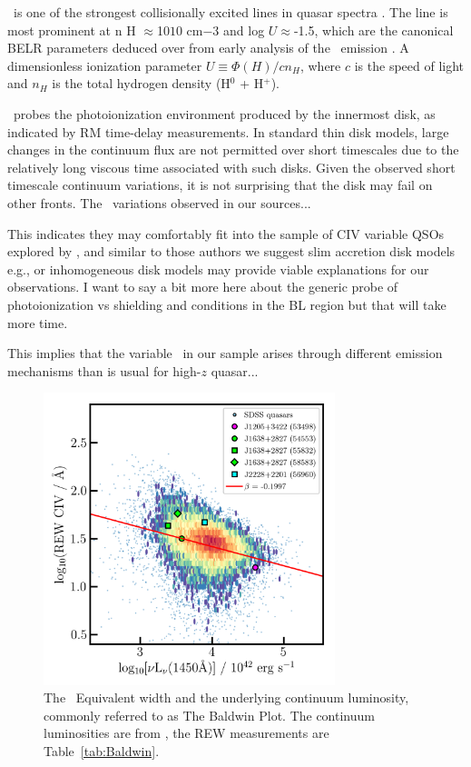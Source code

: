 \documentclass[a4paper,fleqn,usenatbib]{mnras}
\begin{document}
\civ\ is one of the strongest collisionally excited lines in quasar
spectra \citet[e.g.][]{HamannFerland1999}.  The line is most prominent
at n H $\approx$10$10$ cm$-3$ and log $U$$\approx$-1.5, which are the
canonical BELR parameters deduced over from early analysis of the
\civ\ emission \citep{Davidson_Netzer1979}.  A dimensionless
ionization parameter $U\equiv \Phi(H) / c n_{H}$, where $c$ is the
speed of light and $n_{H}$ is the total hydrogen density (H$^{0}$ +
H$^{+}$).

\civ\ probes the photoionization environment produced by the innermost
disk, as indicated by RM time-delay measurements. In standard \citet{SS73}
thin disk models, large changes in the continuum flux are not
permitted over short timescales due to the relatively long viscous
time associated with such disks. Given the observed short timescale
continuum variations, it is not surprising that the \citet{SS73} disk may fail
on other fronts. The \civ\ variations observed in our sources... 

This indicates they may comfortably fit into the sample of CIV
variable QSOs explored by \citet{Dyer2019}, and similar to those
authors we suggest slim accretion disk models e.g., 
\citet[][]{Abramowicz1988} or inhomogeneous disk models
\citep[e.g.,][]{DexterAgol2011} may provide viable explanations for
our observations. I want to say a bit more here about the generic
probe of photoionization vs shielding and conditions in the BL region
but that will take more time.

This implies that the variable \civ\ in our sample arises through
different emission mechanisms than is usual for high-$z$ quasar...

\begin{figure}
  \centering
  \includegraphics[width=8.5cm, trim=0.2cm 0.2cm 0.0cm 0.2cm, clip]
  {figures/CIV_CLQs_Baldwin_20191108.png}
   \vspace{-12pt}
   \caption[]{The \civ\ Equivalent width and the underlying continuum luminosity,
     commonly referred to as The Baldwin Plot.
     The continuum luminosities are  from \citet{Calderone2017},
     the REW measurements are Table~\ref{tab:Baldwin}.}
  \label{fig:CIV_Baldwin}
\end{figure}
\end{document}
